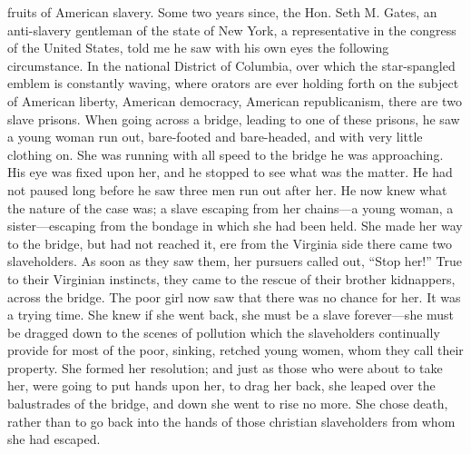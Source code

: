 fruits of American slavery. Some two years since, the Hon. Seth M.
Gates, an anti-slavery gentleman of the state of New York, a
representative in the congress of the United States, told me he saw with
his own eyes the following circumstance. In the national {}District of
Columbia, over which the star-spangled emblem is constantly waving,
where orators are ever holding forth on the subject of American liberty,
American democracy, American republicanism, there are two slave prisons.
When going across a bridge, leading to one of these prisons, he saw a
young woman run out, bare-footed and bare-headed, and with very little
clothing on. She was running with all speed to the bridge he was
approaching. His eye was fixed upon her, and he stopped to see what was
the matter. He had not paused long before he saw three men run out after
her. He now knew what the nature of the case was; a slave escaping from
her chains---a young woman, a sister---escaping from the bondage in
which she had been held. She made her way to the bridge, but had not
reached it, ere from the Virginia side there came two slaveholders. As
soon as they saw them, her pursuers called out, ``Stop her!'' True to
their Virginian instincts, they came to the rescue of their brother
kidnappers, across the bridge. The poor girl now saw that there was no
chance for her. It was a trying time. She knew if she went back, she
must be a slave forever---she must be dragged down to the scenes of
pollution which the slaveholders continually provide for most of the
poor, sinking, retched young women, whom they call their property. She
formed her resolution; and just as those who were about to take her,
were going to put hands upon her, to drag her back, she leaped over the
balustrades of the bridge, and down she went to rise no more. She chose
death, rather than to go back into the hands of those christian
slaveholders from whom she had escaped.

